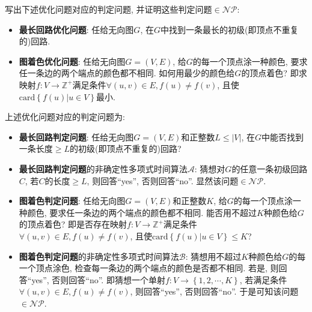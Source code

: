 \documentclass{article}
\begin{document}
\begin{homeworkProblem}
	写出下述优化问题对应的判定问题, 并证明这些判定问题$\in \mathcal{NP}$:
	\begin{itemize}
		\item \textbf{最长回路优化问题}: 任给无向图$G$, 在$G$中找到一条最长的初级(即顶点不重复的)回路.
		\item \textbf{图着色优化问题}: 任给无向图$G=(V,E)$, 给$G$的每一个顶点涂一种颜色, 要求任一条边的两个端点的颜色都不相同. 如何用最少的颜色给$G$的顶点着色? 即求映射$f:V\to \mathbb{Z}^{+}$满足条件$\forall (u,v)\in E,f(u)\neq f(v)$, 且使$\text{card}\left\{ f\left( u \right) |u\in V \right\}$最小.
	\end{itemize}
	\solution 上述优化问题对应的判定问题为:
	\begin{itemize}
		\item \textbf{最长回路判定问题}: 任给无向图$G=(V,E)$和正整数$L\leq |V|$, 在$G$中能否找到一条长度$\geq L$的初级(即顶点不重复的)回路?
		\item \textbf{最长回路判定问题}的非确定性多项式时间算法$\mathcal{A}$: 猜想对$G$的任意一条初级回路$C$, 若$C$的长度$\geq L$, 则回答“yes”, 否则回答“no”. 显然该问题$\in \mathcal{NP}$.
		\item \textbf{图着色判定问题}: 任给无向图$G=(V,E)$和正整数$K$, 给$G$的每一个顶点涂一种颜色, 要求任一条边的两个端点的颜色都不相同. 能否用不超过$K$种颜色给$G$的顶点着色? 即是否存在映射$f:V\to \mathbb{Z}^{+}$满足条件$\forall (u,v)\in E,f(u)\neq f(v)$, 且使$\text{card}\left\{ f\left( u \right) |u\in V \right\}\leq K$?
		\item \textbf{图着色判定问题}的非确定性多项式时间算法$\mathcal{B}$: 猜想用不超过$K$种颜色给$G$的每一个顶点涂色, 检查每一条边的两个端点的颜色是否都不相同. 若是, 则回答“yes”, 否则回答“no”. 即猜想一个单射$f:V\to \left\{ 1,2,\cdots,K \right\}$, 若满足条件$\forall (u,v)\in E,f(u)\neq f(v)$, 则回答“yes”, 否则回答“no”. 于是可知该问题$\in \mathcal{NP}$.
	\end{itemize}
\end{homeworkProblem}


\end{document}
